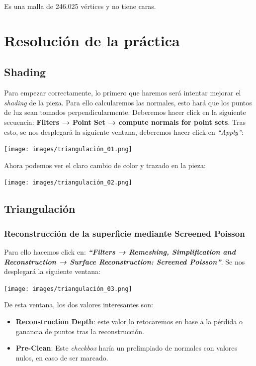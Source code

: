 \documentclass[options]{article}
\begin{document}
Es una malla de 246.025 vértices y no tiene caras.
\pagebreak

\section{Resolución de la práctica}
\subsection{Shading}

Para empezar correctamente, lo primero que haremos será intentar mejorar el \textit{shading} de la pieza. Para ello calcularemos las normales, esto hará que los puntos de luz sean tomados perpendicularmente. Deberemos hacer click en la siguiente secuencia: \textbf{Filters → Point Set → compute normals for point sets}. Tras esto, se nos desplegará la siguiente ventana, deberemos hacer click en \textit{``Apply''}:

\begin{center}
    \texttt{[image: images/triangulación\_01.png]}    
\end{center}

Ahora podemos ver el claro cambio de color y trazado en la pieza:
\begin{center}
    \texttt{[image: images/triangulación\_02.png]}    
\end{center}
\subsection{Triangulación}

\subsubsection{Reconstrucción de la superficie mediante Screened Poisson}
Para ello hacemos click en: \textbf{\textit{``Filters → Remeshing, Simplification and Reconstruction → Surface Reconstruction: Screened Poisson''}}. Se nos desplegará la siguiente ventana:

\begin{center}
    \texttt{[image: images/triangulación\_03.png]}    
\end{center}

De esta ventana, los dos valores interesantes son:
\begin{itemize}
    \item \textbf{Reconstruction Depth}: este valor lo retocaremos en base a la pérdida o ganancia de puntos tras la reconstrucción.
    \item \textbf{Pre-Clean}: Este \textit{checkbox} haría un prelimpiado de normales con valores nulos, en caso de ser marcado.
\end{itemize}
\end{document}
